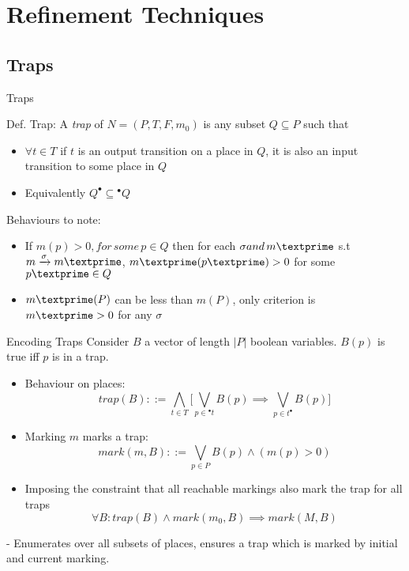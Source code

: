\documentclass{beamer}
\begin{document}
\section{Refinement Techniques}

\subsection{Traps}

\begin{frame}{Traps}
\begin{block}{Def. Trap:}
  A \textit{trap} of $N =(P,T,F,m_0)$ is any subset $Q \subseteq P$ such that 
    \begin{itemize}
      \item $\forall t \in T $ if $t$ is an output transition on a place in $Q$, it is also an input transition to some place in $Q$
      \item Equivalently $Q^\bullet \subseteq {}^\bullet Q$
    \end{itemize}
\end{block}
Behaviours to note:
\begin{itemize}
  \item If $m(p) > 0 ,for\, some\, p\in Q$ then for each $\sigma and\, m\textprime$  s.t $ m\xrightarrow{\sigma}m\textprime$, $m\textprime(p\textprime) > 0$ for some $p\textprime \in Q$
  \item $m\textprime(P)$ can be less than $m(P)$, only criterion is $m\textprime > 0$ for any $\sigma$
 
\end{itemize}
\end{frame}

\begin{frame}{Encoding Traps}
Consider $B$ a vector of length $|P|$ boolean variables. $B(p)$ is true iff $p$ is in a trap.
 \begin{itemize}
    \item Behaviour on places:
    \begin{equation}
     trap(B) ::= \bigwedge\limits_{t\in T} \bigg[ \bigvee\limits_{p\in{}^\bullet t} B(p) \implies \bigvee\limits_{p\in t^\bullet} B(p) \bigg]
    \end{equation}
    \item Marking $m$ marks a trap: 
    \begin{equation}
            mark(m,B) ::= \bigvee\limits_{p\in P} B(p)\land (m(p) >0)
    \end{equation}
    \item Imposing the constraint that all reachable markings also mark the trap for all traps
            \begin{equation}
              \forall B: trap(B) \land mark(m_0,B) \implies mark(M,B)
            \end{equation}
  \end{itemize}
- Enumerates over all subsets of places, ensures a trap which is marked by initial and current marking.
\end{frame}
\end{document}

